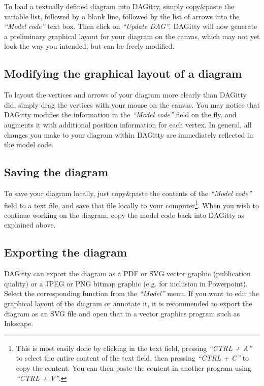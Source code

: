 \documentclass[a4paper,10pt]{article}
\newcommand{\pname}{{\sc DAG}itty\xspace}
\newcommand{\action}[1]{\emph{``#1''}}
\begin{document}
To load a textually defined diagram into \pname, simply copy\&paste the 
variable list, followed by a blank line,
followed by the list of arrows into the \action{Model code} text
box. Then click on \action{Update DAG}.
\pname will now generate a preliminary graphical layout for your diagram on 
the canvas, which may not yet look the way you intended, but can be freely 
modified.

\subsection{Modifying the graphical layout of a diagram}

To layout the vertices and arrows of your diagram more clearly than \pname
did, simply drag the vertices with your mouse on the canvas. You may notice
that \pname modifies the information in the \action{Model code} field
on the fly, and augments it with additional position information for each
vertex. In general, all changes you make to your diagram within \pname 
are immediately reflected in the model code. 

\subsection{Saving the diagram} 

To save your diagram locally, just copy\&paste the contents of the \action{Model code}
field to a text file, 
and save that file locally to your computer\footnote{This is most easily done
by clicking in the text field, pressing \action{CTRL + A} to select the entire content
of the text field, then pressing \action{CTRL + C} to copy the content. You
can then paste the content in another program using \action{CTRL + V}.}.
When you wish to continue working on the
diagram, copy the model code back into \pname as explained above. 

\subsection{Exporting the diagram}

\pname can export the diagram as a PDF or SVG vector graphic (publication quality)
or a JPEG or PNG bitmap graphic (e.g. for inclusion in Powerpoint). Select the
corresponding function from the \action{Model} menu. If you want to edit the graphical
layout of the diagram or annotate it, it is recommended to export the diagram as an
SVG file and open that in a vector graphics program such as Inkscape.
\end{document}
